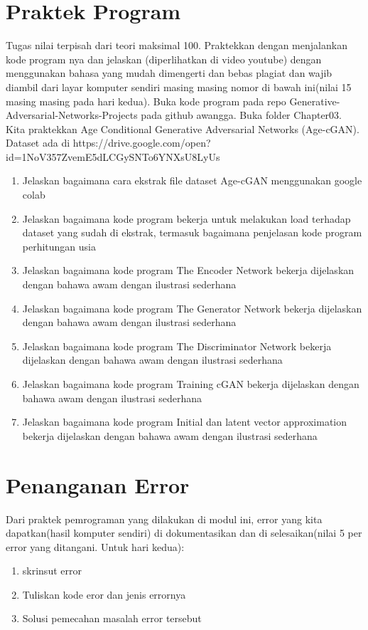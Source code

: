 \section{Praktek Program}
Tugas nilai terpisah dari teori maksimal 100. Praktekkan dengan menjalankan kode program nya dan jelaskan (diperlihatkan di video youtube) dengan menggunakan bahasa yang mudah dimengerti dan bebas plagiat dan wajib diambil dari layar komputer sendiri masing masing nomor di bawah ini(nilai 15 masing masing pada hari kedua). Buka kode program pada repo Generative-Adversarial-Networks-Projects pada github awangga. Buka folder Chapter03. Kita praktekkan Age Conditional Generative Adversarial Networks (Age-cGAN). Dataset ada di https://drive.google.com/open?id=1NoV357ZvemE5dLCGySNTo6YNXsU8LyUs
\begin{enumerate}
\item
Jelaskan bagaimana cara ekstrak file dataset Age-cGAN menggunakan google colab
\item
Jelaskan bagaimana kode program bekerja untuk melakukan load terhadap dataset yang sudah di ekstrak, termasuk bagaimana penjelasan kode program perhitungan usia
\item
Jelaskan bagaimana kode program The Encoder Network bekerja dijelaskan dengan bahawa awam dengan ilustrasi sederhana
\item
Jelaskan bagaimana kode program The Generator Network bekerja dijelaskan dengan bahawa awam dengan ilustrasi sederhana
\item
Jelaskan bagaimana kode program The Discriminator Network bekerja dijelaskan dengan bahawa awam dengan ilustrasi sederhana
\item
Jelaskan bagaimana kode program Training cGAN bekerja dijelaskan dengan bahawa awam dengan ilustrasi sederhana
\item
Jelaskan bagaimana kode program Initial dan latent vector approximation bekerja dijelaskan dengan bahawa awam dengan ilustrasi sederhana
\end{enumerate}

\section{Penanganan Error}
Dari praktek pemrograman yang dilakukan di modul ini, error yang kita dapatkan(hasil komputer sendiri) di dokumentasikan dan di selesaikan(nilai 5 per error yang ditangani. Untuk hari kedua):

\begin{enumerate}
	\item skrinsut error
	\item Tuliskan kode eror dan jenis errornya
	\item Solusi pemecahan masalah error tersebut
\end{enumerate}